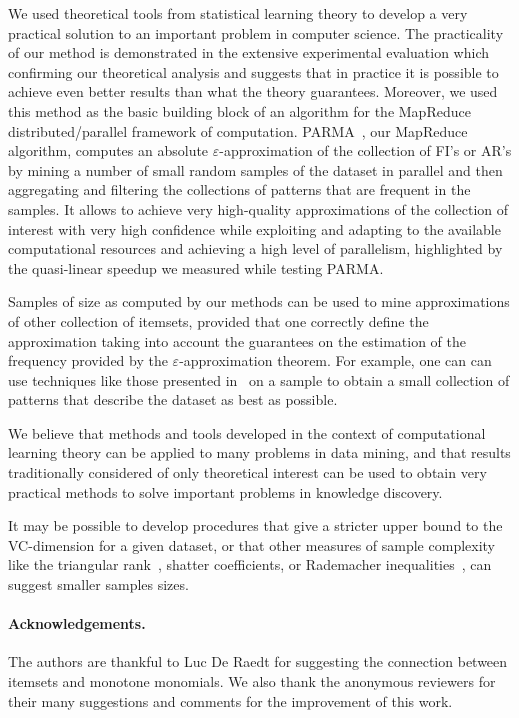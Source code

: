We used theoretical tools from statistical learning theory to develop a very
practical solution to an important problem in computer science. The practicality
of our method is demonstrated in the extensive experimental evaluation which
confirming our theoretical analysis and suggests that in practice it is possible
to achieve even better results than what the theory guarantees. Moreover, we
used this method as the basic building block of an algorithm for the
MapReduce~\citep{DeanS04} distributed/parallel framework of computation.
PARMA~\citep{RiondatoDFU12}, our MapReduce algorithm, computes an absolute
$\varepsilon$-approximation of the collection of FI's or AR's by mining a number
of small random samples of the dataset in parallel and then aggregating and
filtering the collections of patterns that are frequent in the samples. It
allows to achieve very high-quality approximations of the collection of interest
with very high confidence while exploiting and adapting to the available
computational resources and achieving a high level of parallelism, highlighted 
by the quasi-linear speedup we measured while testing PARMA.

Samples of size as computed by our methods can be used to mine approximations
of other collection of itemsets, provided that one correctly define the
approximation taking into account the guarantees on the estimation of the
frequency provided by the $\varepsilon$-approximation theorem. For example, one
can can use techniques like those presented in~\citep{MampaeyTV11} on a sample
to obtain a small collection of patterns that describe the dataset as best as
possible.

We believe that methods and tools developed in the context of computational
learning theory can be applied to many problems in data mining, and that results
traditionally considered of only theoretical interest can be used to obtain very
practical methods to solve important problems in knowledge discovery.

It may be possible to develop procedures that give a stricter upper bound to the
VC-dimension for a given dataset, or that other measures of sample complexity
like the triangular rank~\citep{NewmanR12}, shatter coefficients, or Rademacher
inequalities~\citep{BoucheronBL05}, can suggest smaller samples sizes. 

\paragraph{Acknowledgements.} The authors are thankful to Luc De Raedt for
suggesting the connection between itemsets and monotone monomials. We also thank
the anonymous reviewers for their many suggestions and comments for the
improvement of this work.

